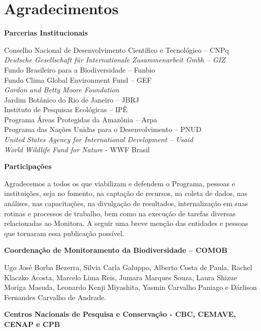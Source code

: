 \documentclass[
  letterpaper,
]{scrbook}
\begin{document}

\chapter*{Agradecimentos}\label{agradecimentos}


\textbf{Parcerias Institucionais}

Conselho Nacional de Desenvolvimento Científico e Tecnológico -- CNPq\\
\emph{Deutsche Gesellschaft für Internationale Zusammenarbeit Gmbh --
GIZ}\\
Fundo Brasileiro para a Biodiversidade -- Funbio\\
Fundo Clima Global Environment Fund -- GEF\\
\emph{Gordon and Betty Moore Foundation}\\
Jardim Botânico do Rio de Janeiro -- JBRJ\\
Instituto de Pesquisas Ecológicas -- IPÊ\\
Programa Áreas Protegidas da Amazônia -- Arpa\\
Programa das Nações Unidas para o Desenvolvimento -- PNUD\\
\emph{United States Agency for International Development -- Usaid}\\
\emph{World Wildlife Fund for Nature} - WWF Brasil

\textbf{Participações}

Agradecemos a todos os que viabilizam e defendem o Programa, pessoas e
instituições, seja no fomento, na captação de recursos, na coleta de
dados, nas análises, nas capacitações, na divulgação de resultados,
internalização em suas rotinas e processos de trabalho, bem como na
execução de tarefas diversas relacionadas ao Monitora. A seguir uma
breve menção das entidades e pessoas que tornaram essa publicação
possível.

\textbf{Coordenação de Monitoramento da Biodiversidade -- COMOB}

Ugo José Borba Bezerra, Silvia Carla Galuppo, Alberto Costa de Paula,
Rachel Klaczko Acosta, Marcelo Lima Reis, Jumara Marques Souza, Laura
Shizue Moriga Masuda, Leonardo Kenji Miyashita, Yasmin Carvalho Paniago
e Dárlison Fernandes Carvalho de Andrade.

\textbf{Centros Nacionais de Pesquisa e Conservação - CBC, CEMAVE, CENAP
e CPB}
\end{document}
